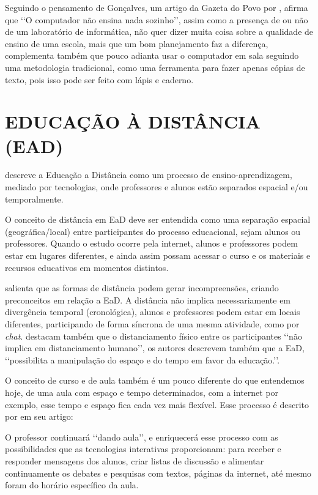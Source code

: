 Seguindo o pensamento de Gonçalves, um artigo da Gazeta do Povo por , afirma que \lq\lq O computador não ensina nada sozinho\rq\rq, assim como a presença de ou não de um laboratório de informática, não quer dizer muita coisa sobre a qualidade de ensino de uma escola, mais que um bom planejamento faz a diferença, complementa também que pouco adianta usar o computador em sala seguindo uma metodologia tradicional, como uma ferramenta para fazer apenas cópias de texto, pois isso pode ser feito com lápis e caderno.

\section{EDUCAÇÃO À DISTÂNCIA (EAD)}

 descreve a Educação a Distância como um processo de ensino-aprendizagem, mediado por tecnologias, onde professores e alunos estão separados espacial e/ou temporalmente.

O conceito de distância em EaD deve ser entendida como uma separação espacial (geográfica/local) entre participantes do processo educacional, sejam alunos ou professores. Quando o estudo ocorre pela internet, alunos e professores podem estar em lugares diferentes, e ainda assim possam acessar o curso e os materiais e recursos educativos em momentos distintos.

 salienta que as formas de distância podem gerar incompreensões, criando preconceitos em relação a EaD. A distância não implica necessariamente em divergência temporal (cronológica), alunos e professores podem estar em locais diferentes, participando de forma síncrona de uma mesma atividade, como por \textit{chat}.   destacam também que o distanciamento físico entre os participantes \lq\lq não implica em distanciamento humano\rq\rq, os autores descrevem também que a EaD, \lq\lq possibilita a manipulação do espaço e do tempo em favor da educação.\rq\rq {}.

O conceito de curso e de aula também é um pouco diferente do que entendemos hoje, de uma aula com espaço e tempo determinados, com a internet por exemplo, esse tempo e espaço fica cada vez mais flexível. Esse processo é descrito por  em seu artigo:
\begin{citacao}
  O professor continuará \lq\lq dando aula\rq\rq, e enriquecerá esse processo com as possibilidades que as tecnologias interativas proporcionam: para receber e responder mensagens dos alunos, criar listas de discussão e alimentar continuamente os debates e pesquisas com textos, páginas da internet, até mesmo foram do horário específico da aula.
\end{citacao}

